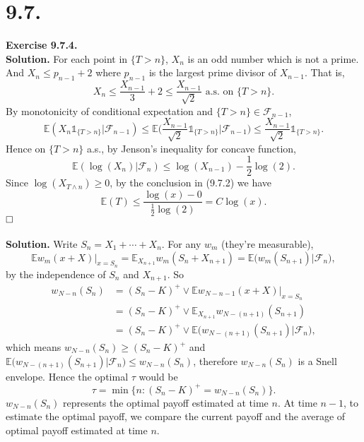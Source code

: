 \documentclass[12pt]{extarticle}
\begin{document}
\section*{9.7.}
\textbf{Exercise 9.7.4.} \\
\textbf{Solution.} For each point in $\{T>n\}$, $X_n$ is an odd number which is not a prime. And $X_n\leq p_{n-1}+2$ where $p_{n-1}$ is the largest prime divisor of $X_{n-1}$. That is,
\begin{equation*}
X_n\leq\frac{X_{n-1}}{3}+2\leq\frac{X_{n-1}}{\sqrt{2}}\text{ a.s. on }\{T>n\}.
\end{equation*}
By monotonicity of conditional expectation and $\{T>n\}\in\mathcal{F}_{n-1}$,
\begin{equation*}
\mathbb{E}(X_n\mathds{1}_{\{T>n\}}|\mathcal{F}_{n-1})\leq\mathbb{E}\Big(\frac{X_{n-1}}{\sqrt{2}}\mathds{1}_{\{T>n\}}\Big|\mathcal{F}_{n-1}\Big)\leq \frac{X_{n-1}}{\sqrt{2}}\mathds{1}_{\{T>n\}}.
\end{equation*}
Hence on $\{T>n\}$ a.s., by Jenson's inequality for concave function,
\begin{equation*}
\mathbb{E}(\log(X_n)|\mathcal{F}_n)\leq\log(X_{n-1})-\frac{1}{2}\log(2).
\end{equation*}
Since $\log(X_{T\wedge n})\geq 0$, by the conclusion in (9.7.2) we have
\begin{equation*}
\mathbb{E}(T)\leq\frac{\log(x)-0}{\frac{1}{2}\log(2)}=C\log(x).
\end{equation*}
$\hspace{\fill}\square$ \\ \\
\textbf{Solution.} Write $S_n=X_1+\cdots+X_n$. For any $w_m$ (they're measurable),
\begin{equation*}
\mathbb{E}w_m(x+X)\big|_{x=S_n}=\mathbb{E}_{X_{n+1}}w_m(S_n+X_{n+1})=\mathbb{E}\big(w_m(S_{n+1})|\mathcal{F}_n\big),
\end{equation*}
by the independence of $S_{n}$ and $X_{n+1}$. So
\begin{equation*}
\begin{aligned}
w_{N-n}(S_n) &=
(S_n-K)^+\vee\mathbb{E}w_{N-n-1}(x+X)\big|_{x=S_{n}} \\&
=(S_n-K)^+\vee\mathbb{E}_{X_{n+1}}w_{N-(n+1)}(S_{n+1}) \\&
=(S_n-K)^+\vee\mathbb{E}\big(w_{N-(n+1)}(S_{n+1})|\mathcal{F}_{n}\big),
\end{aligned}
\end{equation*}
which means $w_{N-n}(S_n)\geq (S_n-K)^+$ and $\mathbb{E}\big(w_{N-(n+1)}(S_{n+1})|\mathcal{F}_n\big)\leq w_{N-n}(S_n)$, therefore $w_{N-n}(S_n)$ is a Snell envelope. Hence the optimal $\tau$ would be
\begin{equation*}
\tau=\min\{n:(S_n-K)^+=w_{N-n}(S_n)\}.
\end{equation*}
$w_{N-n}(S_n)$ represents the optimal payoff estimated at time $n$. At time $n-1$, to estimate the optimal payoff, we compare the current payoff and the average of optimal payoff estimated at time $n$.
 
\end{document}
